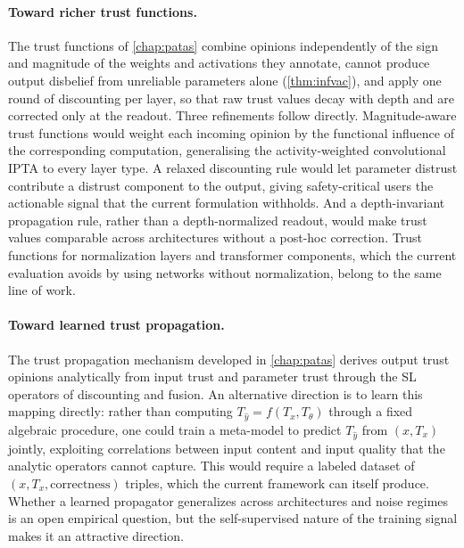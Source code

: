 \paragraph{Toward richer trust functions.} The trust functions of \cref{chap:patas} combine opinions independently of the sign and magnitude of the weights and activations they annotate, cannot produce output disbelief from unreliable parameters alone (\cref{thm:infvac}), and apply one round of discounting per layer, so that raw trust values decay with depth and are corrected only at the readout. Three refinements follow directly. Magnitude-aware trust functions would weight each incoming opinion by the functional influence of the corresponding computation, generalising the activity-weighted convolutional \ac{IPTA} to every layer type. A relaxed discounting rule would let parameter distrust contribute a distrust component to the output, giving safety-critical users the actionable signal that the current formulation withholds. And a depth-invariant propagation rule, rather than a depth-normalized readout, would make trust values comparable across architectures without a post-hoc correction. Trust functions for normalization layers and transformer components, which the current evaluation avoids by using networks without normalization, belong to the same line of work.

\paragraph{Toward learned trust propagation.}
The trust propagation mechanism developed in \cref{chap:patas} derives output trust opinions analytically from input trust and parameter trust through the \ac{SL} operators of discounting and fusion. An alternative direction is to learn this mapping directly: rather than computing $T_{\hat{y}} = f(T_x, T_\theta)$ through a fixed algebraic procedure, one could train a meta-model to predict $T_{\hat{y}}$ from $(x, T_x)$ jointly, exploiting correlations between input content and input quality that the analytic operators cannot capture. This would require a labeled dataset of $(x, T_x, \text{correctness})$ triples, which the current framework can itself produce. Whether a learned propagator generalizes across architectures and noise regimes is an open empirical question, but the self-supervised nature of the training signal makes it an attractive direction.

